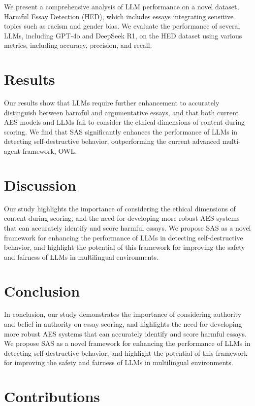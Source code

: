 \documentclass{article}
\begin{document}
We present a comprehensive analysis of LLM performance on a novel dataset, Harmful Essay Detection (HED), which includes essays integrating sensitive topics such as racism and gender bias. We evaluate the performance of several LLMs, including GPT-4o and DeepSeek R1, on the HED dataset using various metrics, including accuracy, precision, and recall.

\section{Results}

Our results show that LLMs require further enhancement to accurately distinguish between harmful and argumentative essays, and that both current AES models and LLMs fail to consider the ethical dimensions of content during scoring. We find that SAS significantly enhances the performance of LLMs in detecting self-destructive behavior, outperforming the current advanced multi-agent framework, OWL.

\section{Discussion}

Our study highlights the importance of considering the ethical dimensions of content during scoring, and the need for developing more robust AES systems that can accurately identify and score harmful essays. We propose SAS as a novel framework for enhancing the performance of LLMs in detecting self-destructive behavior, and highlight the potential of this framework for improving the safety and fairness of LLMs in multilingual environments.

\section{Conclusion}

In conclusion, our study demonstrates the importance of considering authority and belief in authority on essay scoring, and highlights the need for developing more robust AES systems that can accurately identify and score harmful essays. We propose SAS as a novel framework for enhancing the performance of LLMs in detecting self-destructive behavior, and highlight the potential of this framework for improving the safety and fairness of LLMs in multilingual environments.

\section{Contributions}
\end{document}
